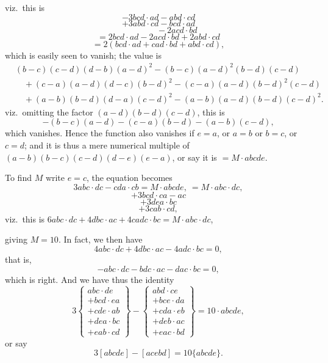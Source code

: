 \documentclass[11pt,a4paper]{article}
\begin{document}
\newpage


viz.\ this is
\[
-3bcd\cdot ad - abd\cdot cd
\]
\[
+ 3abd\cdot cd - bcd\cdot ad
\]
\[
\phantom{+ 3abd\cdot cd} - 2acd\cdot bd
\]
\[
= 2bcd\cdot ad - 2acd\cdot bd + 2abd\cdot cd
\]
\[
= 2(bcd\cdot ad + cad\cdot bd + abd\cdot cd),
\]
which is easily seen to vanish; the value is
\begin{align*}
&(b - c)(c - d)(d - b)(a - d)^{2} - (b - c)(a - d)^{2}(b - d)(c - d)\\
&\quad + (c - a)(a - d)(d - c)(b - d)^{2} - (c - a)(a - d)(b - d)^{2}(c - d)\\
&\quad + (a - b)(b - d)(d - a)(c - d)^{2} - (a - b)(a - d)(b - d)(c - d)^{2}.
\end{align*}
viz.\ omitting the factor $(a - d)(b - d)(c - d)$, this is
\[
-(b - c)(a - d) - (c - a)(b - d) - (a - b)(c - d),
\]
which vanishes. Hence the function also vanishes if $e = a$, or $a = b$ or $b = c$, or $c = d$; and it is thus a mere numerical multiple of $(a - b)(b - c)(c - d)(d - e)(e - a)$, or say it is $= M\cdot abcde$.

\medskip

To find $M$ write $e = c$, the equation becomes
\[
3abc\cdot dc - cda\cdot cb = M\cdot abcde,\ = M\cdot abc\cdot dc,
\]
\[
+ 3bcd\cdot ca - ac
\]
\[
+ 3dea\cdot bc
\]
\[
+ 3cab\cdot cd,
\]
viz.\ this is $6abc\cdot dc + 4dbc\cdot ac + 4cadc\cdot bc = M\cdot abc\cdot dc$,

\medskip

\noindent giving $M = 10$. In fact, we then have
\[
4abc\cdot dc + 4dbc\cdot ac - 4adc\cdot bc = 0,
\]
that is,
\[
-abc\cdot dc - bdc\cdot ac - dac\cdot bc = 0,
\]
which is right. And we have thus the identity
\[
3\left\{\begin{array}{l} abc\cdot de\\ + bcd\cdot ea\\ + cde\cdot ab\\ + dea\cdot bc\\ + eab\cdot cd\end{array}\right\}
- \left\{\begin{array}{l} abd\cdot ce\\ + bce\cdot da\\ + cda\cdot eb\\ + deb\cdot ac\\ + eac\cdot bd\end{array}\right\}
= 10\cdot abcde,
\]
or say
\[
3[abcde] - [acebd] = 10\{abcde\}.
\]
\end{document}
